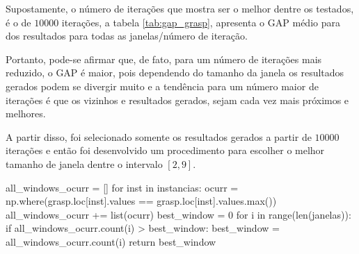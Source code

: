 \documentclass[a4paper, 12pt]{article}
\begin{document}
Supostamente, o número de iterações que mostra ser o melhor dentre os testados, é o de $10000$ iterações, a
tabela \ref{tab:gap_grasp}, apresenta o GAP médio para dos resultados para todas as janelas/número de iteração.

\begin{table}[htbp]
    \centering
\end{table}

Portanto, pode-se afirmar que, de fato, para um número de iterações mais reduzido, o GAP é maior, pois
dependendo do tamanho da janela os resultados gerados podem se divergir muito e a tendência para um número
maior de iterações é que os vizinhos e resultados gerados, sejam cada vez mais próximos e melhores.

A partir disso, foi selecionado somente os resultados gerados a partir de $10000$ iterações
e então foi desenvolvido um procedimento para escolher o melhor tamanho de janela dentre o intervalo $[2,9]$.

\begin{algorithm}
    \begin{algorithmic}[1]
        \State all\_windows\_ocurr = []
        \State for inst in instancias:  
        \State { }{ }{ }{ }ocurr = np.where(grasp.loc[inst].values == grasp.loc[inst].values.max())
        \State { }{ }{ }{ }all\_windows\_ocurr += list(ocurr)
        \State best\_window = 0
        \State for i in range(len(janelas)):
        \State { }{ }{ }{ }if all\_windows\_ocurr.count(i) > best\_window:
        \State { }{ }{ }{ }{ }{ }{ }{ }best\_window = all\_windows\_ocurr.count(i)
        \State return best\_window
      \EndFunction
    \end{algorithmic}
  \end{algorithm}
\end{document}
